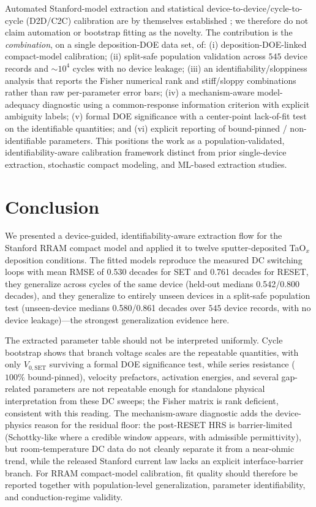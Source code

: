 \documentclass[journal]{IEEEtran}
\begin{document}
Automated Stanford-model extraction and statistical device-to-device/cycle-to-cycle
(D2D/C2C) calibration are by themselves established
\cite{guan2012spice,jiang2016verification}; we therefore do not claim
automation or bootstrap fitting as the novelty.  The contribution is the
\emph{combination}, on a single deposition-DOE data set, of: (i) deposition-DOE-linked
compact-model calibration; (ii) split-safe population validation across $545$
device records and $\sim\!10^4$ cycles with no device leakage; (iii) an
identifiability/sloppiness analysis that reports the Fisher numerical rank and
stiff/sloppy combinations rather than raw per-parameter error bars; (iv) a
mechanism-aware model-adequacy diagnostic using a common-response information
criterion with explicit ambiguity labels; (v) formal DOE significance with a
center-point lack-of-fit test on the identifiable quantities; and (vi) explicit
reporting of bound-pinned / non-identifiable parameters.  This positions the
work as a population-validated, identifiability-aware calibration framework
distinct from prior single-device extraction, stochastic compact modeling, and
ML-based extraction studies.

\section{Conclusion}
\label{sec:conclusion}

We presented a device-guided, identifiability-aware extraction flow for the
Stanford RRAM compact model and applied it to twelve sputter-deposited TaO$_x$
deposition conditions.  The fitted models reproduce the measured DC switching
loops with mean RMSE of 0.530 decades for SET and 0.761 decades for RESET, they
generalize across cycles of the same device (held-out medians 0.542/0.800
decades), and they generalize to entirely unseen devices in a split-safe
population test (unseen-device medians 0.580/0.861 decades over $545$ device
records, with no device leakage)---the strongest generalization evidence here.

The extracted parameter table should not be interpreted uniformly.  Cycle
bootstrap shows that branch voltage scales are the repeatable quantities, with
only $V_{0,\mathrm{SET}}$ surviving a formal DOE significance test, while series
resistance ($100\%$ bound-pinned), velocity prefactors, activation energies, and
several gap-related parameters are not repeatable enough for standalone physical
interpretation from these DC sweeps; the Fisher matrix is rank deficient,
consistent with this reading.  The mechanism-aware diagnostic adds the
device-physics reason for the residual floor: the post-RESET HRS is
barrier-limited (Schottky-like where a credible window appears, with admissible
permittivity), but room-temperature DC data do not cleanly separate it from a
near-ohmic trend, while the released Stanford current law lacks an explicit
interface-barrier branch.  For RRAM compact-model calibration, fit quality
should therefore be reported together with population-level generalization,
parameter identifiability, and conduction-regime validity.
\end{document}
